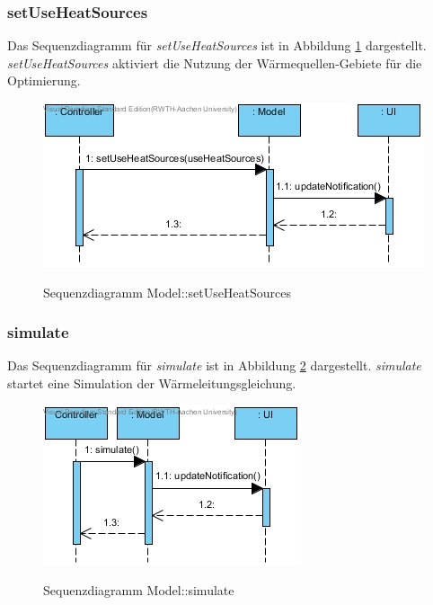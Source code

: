 \subsubsection*{setUseHeatSources}

Das Sequenzdiagramm für \emph{setUseHeatSources} ist in Abbildung \ref{Sequenzdiagramm Model::setUseHeatSources} dargestellt. \emph{setUseHeatSources} aktiviert die Nutzung der Wärmequellen-Gebiete für die Optimierung.

\begin{figure}[H]
	\centering
	\includegraphics[scale=.85]{Bilder/Model__setUseHeatSources().jpg}\\
	\caption{Sequenzdiagramm Model::setUseHeatSources}
	\label{Sequenzdiagramm Model::setUseHeatSources}
\end{figure}

\subsubsection*{simulate}

Das Sequenzdiagramm für \emph{simulate} ist in Abbildung \ref{Sequenzdiagramm Model::simulate} dargestellt. \emph{simulate} startet eine Simulation der Wärmeleitungsgleichung.

\begin{figure}[H]
	\centering
	\includegraphics[scale=.85]{Bilder/Model__simulate().jpg}\\
	\caption{Sequenzdiagramm Model::simulate}
	\label{Sequenzdiagramm Model::simulate}
\end{figure}


